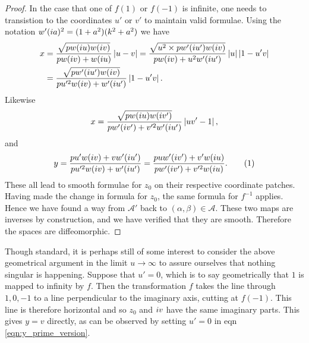 \begin{lem}
\begin{proof}
In the case that one of $f(1)$ or $f(-1)$ is infinite, one needs to transistion to the coordinates $u'$ or $v'$ to maintain valid formulae. Using the notation $w'(i a)^2 = (1+a^2)(k^2 + a^2)$ we have
\begin{align*}
x
&= \frac{\sqrt{pw(i u)w(i v)}}{pw(i v) + w(i u)} \left|u-v\right|
= \frac{\sqrt{u^2 \times pw'(i u')w(i v)}}{pw(i v) + u^2 w'(i u')} \left|u\right|\left|1-u'v\right| \\
&= \frac{\sqrt{pw'(i u')w(i v)}}{pu'^2w(i v) + w'(i u')} \left|1-u'v\right|.
\end{align*}
Likewise
\[
x
= \frac{\sqrt{pw(i u)w(i v')}}{pw'(i v') + v'^2w'(i u')} \left|uv'-1\right|,
\]
and
\[
y
= \frac{pu'w(\iu v) + vw'(\iu u')}{pu'^2w(\iu v) + w'(\iu u')}
= \frac{puw'(\iu v') + v'w(\iu u)}{pw'(\iu v') + v'^2w(\iu u)}. \labelthis{eqn:y_prime_version}
\]
These all lead to smooth formulae for $z_0$ on their respective coordinate patches. Having made the change in formula for $z_0$, the same formula for $f^{-1}$ applies. Hence we have found a way from $\mathcal{A}'$ back to $(α,β) \in \mathcal{A}$. These two maps are inverses by construction, and we have verified that they are smooth. Therefore the spaces are diffeomorphic.
\end{proof}
\end{lem}

Though standard, it is perhaps still of some interest to consider the above geometrical argument in the limit $u\to\infty$ to assure ourselves that nothing singular is happening. Suppose that $u' = 0$, which is to say geometrically that $1$ is mapped to infinity by $f$. Then the transformation $f$ takes the line through $1,0,-1$ to a line perpendicular to the imaginary axis, cutting at $f(-1)$. This line is therefore horizontal and so $z_0$ and $i v$ have the same imaginary parts. This gives $y=v$ directly, as can be observed by setting $u'=0$ in eqn \ref{eqn:y_prime_version}.

